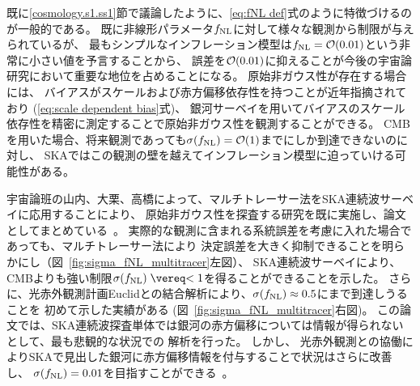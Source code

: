 \begin{enumerate}
\begin{description}
既に\ref{cosmology.s1.ss1}節で議論したように、\eqref{eq:fNL def}式のように特徴づけるのが一般的である。
既に非線形パラメータ$f_{\rm NL}$に対して様々な観測から制限が与えられているが、
最もシンプルなインフレーション模型は$f_{\rm NL}={\cal O}(0.01)$という非常に小さい値を予言することから、
誤差を${\cal O}(0.01)$に抑えることが今後の宇宙論研究において重要な地位を占めることになる。
原始非ガウス性が存在する場合には、%
バイアスがスケールおよび赤方偏移依存性を持つことが近年指摘されており (\eqref{eq:scale dependent bias}式)、
銀河サーベイを用いてバイアスのスケール依存性を精密に測定することで原始非ガウス性を観測することができる。
CMBを用いた場合、将来観測であっても$\sigma (f_{\rm NL})={\cal O}(1)$までにしか到達できないのに対し、
SKAではこの観測の壁を越えてインフレーション模型に迫っていける可能性がある。

宇宙論班の山内、大栗、高橋によって、マルチトレーサー法をSKA連続波サーベイに応用することにより、
原始非ガウス性を探査する研究を既に実施し、論文としてまとめている~\citep{Yamauchi:2014ioa}。
実際的な観測に含まれる系統誤差を考慮に入れた場合であっても、マルチトレーサー法により
決定誤差を大きく抑制できることを明らかにし（図~\ref{fig:sigma_fNL_multitracer}左図）、
SKA連続波サーベイにより、CMBよりも強い制限$\sigma (f_{\rm NL})\lesssim 1$を得ることができることを示した。
さらに、光赤外観測計画Euclidとの結合解析により、$\sigma (f_{\rm NL})\approx 0.5$にまで到達しうることを
初めて示した実績がある (図~\ref{fig:sigma_fNL_multitracer}右図)。
この論文では、SKA連続波探査単体では銀河の赤方偏移については情報が得られないとして、最も悲観的な状況での
解析を行った。
しかし、%
光赤外観測との協働によりSKAで見出した銀河に赤方偏移情報を付与することで状況はさらに改善し、
$\sigma (f_{\rm NL})=0.01$を目指すことができる~\citep{Kitching:2015fra,Takahashi:2015zqa}。



\end{description}
\end{enumerate}
